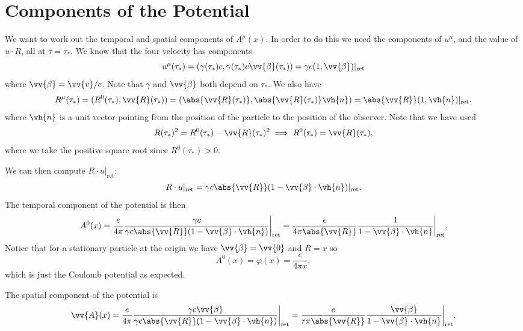 \documentclass[fleqn]{NotesClass}
\newcommand*{\ret}{{\text{ret}}}
\begin{document}
    \section{Components of the Potential}
    We want to work out the temporal and spatial components of \(A^\mu(x)\).
    In order to do this we need the components of \(u^\mu\), and the value of \(u \cdot R\), all at \(\tau = \tau_*\).
    We know that the four velocity has components
    \begin{equation}
        u^\mu(\tau_*) = (\gamma(\tau_*) c, \gamma(\tau_*) c \vv{\beta}(\tau_*)) = \gamma c(1, \vv{\beta})|_{\ret}
    \end{equation}
    where \(\vv{\beta} = \vv{v}/c\).
    Note that \(\gamma\) and \(\vv{\beta}\) both depend on \(\tau_*\).
    We also have
    \begin{equation}
        R^\mu(\tau_*) = (R^0(\tau_*), \vv{R}(\tau_*)) = (\abs{\vv{R}(\tau_*)}, \abs{\vv{R}(\tau_*)}\vh{n}) = \abs{\vv{R}}(1, \vh{n}) |_{\ret}.
    \end{equation}
    where \(\vh{n}\) is a unit vector pointing from the position of the particle to the position of the observer.
    Note that we have used
    \begin{equation}
        R(\tau_*)^2 = R^0(\tau_*) - \vv{R}(\tau_*)^2 \implies R^0(\tau_*) = \vv{R}(\tau_*),
    \end{equation}
    where we take the positive square root since \(R^0(\tau_*) > 0\).
    
    We can then compute \(R \cdot u |_{\ret}\):
    \begin{equation}
        R \cdot u |_{\ret} = \gamma c \abs{\vv{R}}(1 - \vv{\beta} \cdot \vh{n}) |_{\ret}.
    \end{equation}
    The temporal component of the potential is then
    \begin{equation}
        A^0(x) = \frac{e}{4\pi} \frac{\gamma c}{\gamma c \abs{\vv{R}}(1 - \vv{\beta}\cdot\vh{n})}\bigg|_{\ret} = \frac{e}{4\pi\abs{\vv{R}}} \frac{1}{1 - \vv{\beta}\cdot\vh{n}}\bigg|_{\ret}.
    \end{equation}
    Notice that for a stationary particle at the origin we have \(\vv{\beta} = \vv{0}\) and \(R = x\) so
    \begin{equation}
        A^0(x) = \varphi(x) = \frac{e}{4\pi x},
    \end{equation}
    which is just the Coulomb potential as expected.
    
    The spatial component of the potential is
    \begin{equation}
        \vv{A}(x) = \frac{e}{4\pi} \frac{\gamma c \vv{\beta}}{\gamma c \abs{\vv{R}}(1 - \vv{\beta}\cdot\vh{n})} \bigg|_{\ret} = \frac{e}{r\pi \abs{\vv{R}}} \frac{\vv{\beta}}{1 - \vv{\beta}\cdot\vh{n}} \bigg|_{\ret}.
    \end{equation}
    
\end{document}
